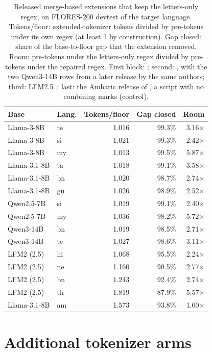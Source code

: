 \begin{table}[!htb]
\centering
\small
\setlength{\tabcolsep}{3pt}
\begin{tabular}{llrrr}
\toprule
Base & Lang. & Tokens/floor & Gap closed & Room \\
\midrule
Llama-3-8B & te & 1.016 & 99.3\% & 3.16$\times$ \\
Llama-3-8B & si & 1.021 & 99.3\% & 2.42$\times$ \\
Llama-3-8B & my & 1.013 & 99.5\% & 5.87$\times$ \\
\midrule
Llama-3.1-8B & ta & 1.018 & 99.1\% & 3.58$\times$ \\
Llama-3.1-8B & bn & 1.020 & 98.7\% & 2.74$\times$ \\
Llama-3.1-8B & gu & 1.026 & 98.9\% & 2.52$\times$ \\
Qwen2.5-7B & si & 1.019 & 99.1\% & 2.40$\times$ \\
Qwen2.5-7B & my & 1.036 & 98.2\% & 5.72$\times$ \\
Qwen3-14B & bn & 1.019 & 98.5\% & 2.71$\times$ \\
Qwen3-14B & te & 1.027 & 98.6\% & 3.11$\times$ \\
\midrule
LFM2 (2.5) & hi & 1.068 & 95.5\% & 2.24$\times$ \\
LFM2 (2.5) & ne & 1.160 & 90.5\% & 2.77$\times$ \\
LFM2 (2.5) & bn & 1.243 & 92.4\% & 2.74$\times$ \\
LFM2 (2.5) & th & 1.819 & 87.9\% & 5.57$\times$ \\
\midrule
Llama-3.1-8B & am & 1.573 & 93.8\% & 1.00$\times$ \\
\bottomrule
\end{tabular}
\caption{Released merge-based extensions that keep the letters-only regex, on FLORES-200 devtest of the target language. Tokens/floor: extended-tokenizer tokens divided by pre-tokens under its own regex (at least 1 by construction). Gap closed: share of the base-to-floor gap that the extension removed. Room: pre-tokens under the letters-only regex divided by pre-tokens under the repaired regex. First block: \citet{yamaguchi2026lowres}; second: \citet{yamaguchi2025elchat}, with the two Qwen3-14B rows from a later release by the same authors; third: LFM2.5~\citep{smith2026inplace}; last: the Amharic release of \citet{yamaguchi2025elchat}, a script with no combining marks (control).}
\label{tab:released}
\end{table}

\section{Additional tokenizer arms}
\label{app:extras}

